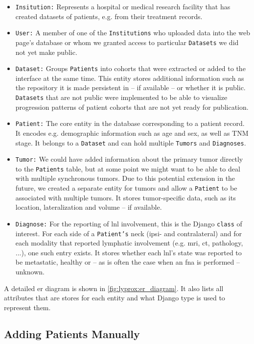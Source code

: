 \documentclass[\relativeRoot/main.tex]{subfiles}
\begin{document}
\begin{itemize}
    \item \texttt{Insitution:} Represents a hospital or medical research facility that has created datasets of patients, e.g. from their treatment records.
    \item \texttt{User:} A member of one of the \texttt{Institutions} who uploaded data into the web page's database or whom we granted access to particular \texttt{Datasets} we did not yet make public.
    \item \texttt{Dataset:} Groups \texttt{Patients} into cohorts that were extracted or added to the interface at the same time. This entity stores additional information such as the repository it is made persistent in -- if available -- or whether it is public. \texttt{Datasets} that are not public were implemented to be able to visualize progression patterns of patient cohorts that are not yet ready for publication.
    \item \texttt{Patient:} The core entity in the database corresponding to a patient record. It encodes e.g. demographic information such as age and sex, as well as TNM stage. It belongs to a \texttt{Dataset} and can hold multiple \texttt{Tumors} and \texttt{Diagnoses}.
    \item \texttt{Tumor:} We could have added information about the primary tumor directly to the \texttt{Patients} table, but at some point we might want to be able to deal with multiple synchronous tumors. Due to this potential extension in the future, we created a separate entity for tumors and allow a \texttt{Patient} to be associated with multiple tumors. It stores tumor-specific data, such as its location, lateralization and volume -- if available.
    \item \texttt{Diagnose:} For the reporting of \acrlong{lnl} involvement, this is the Django \texttt{class} of interest. For each side of a \texttt{Patient's} neck (ipsi- and contralateral) and for each modality that reported lymphatic involvement (e.g. \gls{mri}, \gls{ct}, pathology, ...), one such entry exists. It stores whether each \gls{lnl}'s state was reported to be metastatic, healthy or -- as is often the case when an \gls{fna} is performed -- unknown.
\end{itemize}

A detailed \gls{er} diagram is shown in \cref{fig:lyprox:er_diagram}. It also lists all attributes that are stores for each entity and what Django type is used to represent them.

\subsection*{Adding Patients Manually}
\label{subsec:lyprox:implementation:add_manual}
\end{document}
